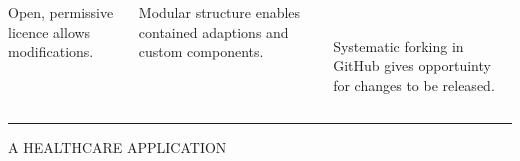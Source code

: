 \documentclass[usenames,dvipsnames,t]{beamer}
\begin{document}
\begin{columns}
\begin{column}{0.5\textwidth}
\begin{center}
\begin{minipage}[c]{0.9\textwidth}
\begin{tcolorbox}[boxrule=2pt, colback=textorange!15,colframe=textorange, title=\small{EXTENDIBLE}, coltitle=white, halign title=right]
\begin{columns}
\begin{column}{0.32\textwidth}
      \small{Open, permissive licence allows modifications.}
    \end{column}
    \begin{column}{0.32\textwidth}
      \begin{center}
      
      \end{center}
      \small{Modular structure enables contained adaptions and custom components.}
    \end{column}
    \begin{column}{0.32\textwidth}
      \begin{center}
      \\
      \end{center}
      \small{Systematic forking in GitHub gives opportuinty for changes to be released.}
    \end{column}
    \hspace{0.02\textwidth}
    \end{columns}
    \end{tcolorbox}
    \vspace{5mm}
  \end{minipage}
  \end{center}

\end{column}
\end{columns}

\vspace{12mm}
\textcolor{textgrey}{\hrule height 3pt}
\vspace{5mm}

\begin{center}
  \textcolor{textgrey}{\Large{A HEALTHCARE APPLICATION}\vspace{4mm}}
\end{center}
\end{document}
